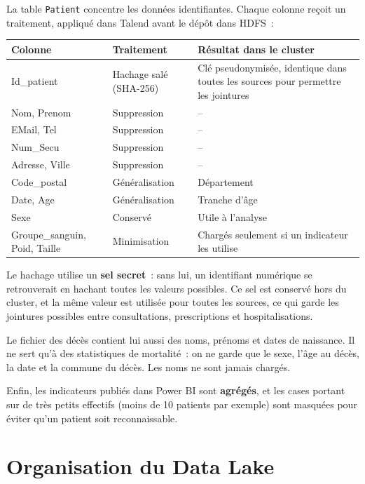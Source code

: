 \noindent La table \texttt{Patient} concentre les données identifiantes. Chaque colonne reçoit un traitement, appliqué dans Talend avant le dépôt dans HDFS~:

\begin{center}
\begin{tabularx}{\textwidth}{>{\ttfamily}l >{\raggedright\arraybackslash}X >{\raggedright\arraybackslash}X}
\toprule
\normalfont\textbf{Colonne} & \textbf{Traitement} & \textbf{Résultat dans le cluster} \\
\midrule
Id\_patient & Hachage salé (SHA-256) & Clé pseudonymisée, identique dans toutes les sources pour permettre les jointures \\
Nom, Prenom & Suppression & -- \\
EMail, Tel & Suppression & -- \\
Num\_Secu & Suppression & -- \\
Adresse, Ville & Suppression & -- \\
Code\_postal & Généralisation & Département \\
Date, Age & Généralisation & Tranche d'âge \\
Sexe & Conservé & Utile à l'analyse \\
Groupe\_sanguin, Poid, Taille & Minimisation & Chargés seulement si un indicateur les utilise \\
\bottomrule
\end{tabularx}
\end{center}

\noindent Le hachage utilise un \textbf{sel secret}~: sans lui, un identifiant numérique se retrouverait en hachant toutes les valeurs possibles. Ce sel est conservé hors du cluster, et la même valeur est utilisée pour toutes les sources, ce qui garde les jointures possibles entre consultations, prescriptions et hospitalisations.

\noindent Le fichier des décès contient lui aussi des noms, prénoms et dates de naissance. Il ne sert qu'à des statistiques de mortalité~: on ne garde que le sexe, l'âge au décès, la date et la commune du décès. Les noms ne sont jamais chargés.

\noindent Enfin, les indicateurs publiés dans Power BI sont \textbf{agrégés}, et les cases portant sur de très petits effectifs (moins de 10 patients par exemple) sont masquées pour éviter qu'un patient soit reconnaissable.

\newpage
\section{Organisation du Data Lake}

